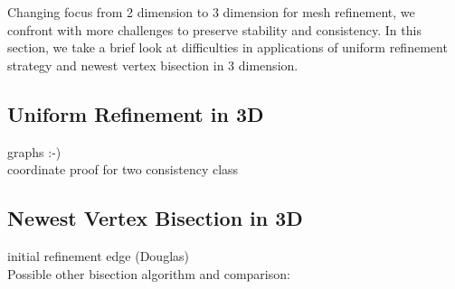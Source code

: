 Changing focus from 2 dimension to 3 dimension for mesh refinement, we confront with more challenges to preserve stability and consistency. In this section, we take a brief look at difficulties in applications of uniform refinement strategy and newest vertex bisection in 3 dimension.

\subsection{Uniform Refinement in 3D}
graphs :-)\\
coordinate proof for two consistency class
\subsection{Newest Vertex Bisection in 3D}
initial refinement edge (Douglas)\\
Possible other bisection algorithm and comparison:

